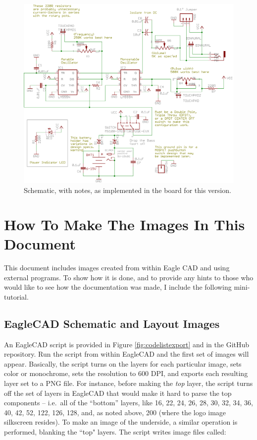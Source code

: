 \documentclass[12pt]{article}
\newcommand{\+}{\item}		%
\newif\ifkey
\begin{document}
\begin{figure}[hb!]
\begin{center}
\includegraphics[scale=0.9]{APCschembetter.png} %
\end{center}
\caption{Schematic, with notes, as implemented in the board for this version.}
\end{figure}

%
%

\ifkey 

\clearpage
\section{How To Make The Images In This Document}

This document includes images created from within Eagle CAD and using external programs. To show how it is done, and to provide any hints to those who would like to see how the documentation was made, I include the following mini-tutorial.

\subsection*{EagleCAD Schematic and Layout Images }

An EagleCAD script is provided in Figure \ref{fig:codelistexport} and in the GitHub repository. Run the script from within EagleCAD and the first set of images will appear. Basically, the script turns on the layers for each particular image, sets color or monochrome, sets the resolution to 600 DPI, and exports each resulting layer set to a PNG file. For instance, before making the \emph{top} layer, the script turns off the set of layers in EagleCAD that would make it hard to parse the top components -- i.e.~all of the ``bottom'' layers, like 16, 22, 24, 26, 28, 30, 32, 34, 36, 40, 42, 52, 122, 126, 128, and, as noted above, 200 (where the logo image silkscreen resides). To make an image of the underside, a similar operation is performed, blanking the ``top" layers. The script writes image files called:
\end{document}
